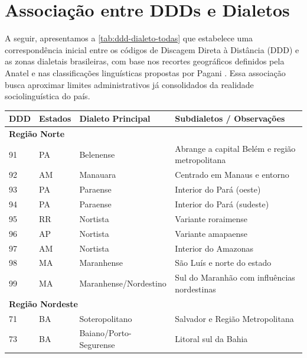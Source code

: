 \section{Associação entre DDDs e Dialetos}
A seguir, apresentamos a \autoref{tab:ddd-dialeto-todas} que estabelece uma correspondência inicial entre os códigos de Discagem Direta à Distância (DDD) e as zonas dialetais brasileiras, com base nos recortes geográficos definidos pela Anatel e nas classificações linguísticas propostas por Pagani \cite{pagani2022}. Essa associação busca aproximar limites administrativos já consolidados da realidade sociolinguística do país.

\begin{table}[ht]
  \centering
  \tiny
  \setlength{\tabcolsep}{6pt}
  \begin{tabular}{llll}
    \toprule
    \textbf{DDD} & \textbf{Estados} & \textbf{Dialeto Principal} & \textbf{Subdialetos / Observações} \\
    \midrule
    \multicolumn{4}{l}{\textbf{Região Norte}} \\ 
    91 & PA      & Belenense             & Abrange a capital Belém e região metropolitana \\
    92 & AM      & Manauara              & Centrado em Manaus e entorno                  \\
    93 & PA      & Paraense              & Interior do Pará (oeste)                      \\
    94 & PA      & Paraense              & Interior do Pará (sudeste)                    \\
    95 & RR      & Nortista              & Variante roraimense                           \\
    96 & AP      & Nortista              & Variante amapaense                            \\
    97 & AM      & Nortista              & Interior do Amazonas                          \\
    98 & MA      & Maranhense            & São Luís e norte do estado                    \\
    99 & MA      & Maranhense/Nordestino & Sul do Maranhão com influências nordestinas   \\
    \midrule
    \multicolumn{4}{l}{\textbf{Região Nordeste}} \\ 
    71 & BA & Soteropolitano          & Salvador e Região Metropolitana          \\
    73 & BA & Baiano/Porto-Segurense  & Litoral sul da Bahia                     \\

\end{tabular}
\end{table}
